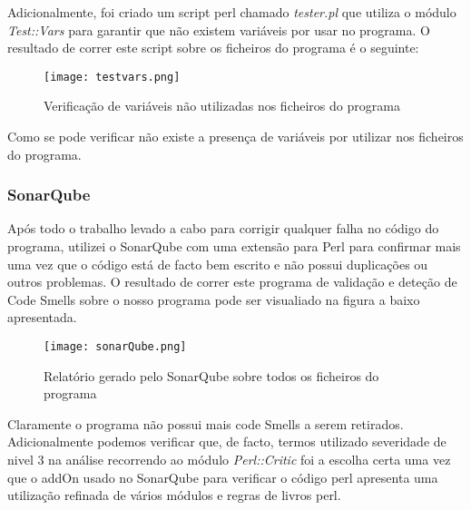 \par Adicionalmente, foi criado um script perl chamado \textit{tester.pl} que utiliza o módulo \textit{Test::Vars}\cite{testVars} para garantir que não existem variáveis por usar no programa. O resultado de correr este script sobre os ficheiros do programa é o seguinte:

\begin{figure}[H]

  \centering
  \captionsetup{justification=centering}

  \texttt{[image: testvars.png]}
  
  \caption {Verificação de variáveis não utilizadas nos ficheiros do programa}

\end{figure}
\par Como se pode verificar não existe a presença de variáveis por utilizar nos ficheiros do programa.


\subsubsection{SonarQube}
\hfill\newline

\par Após todo o trabalho levado a cabo para corrigir qualquer falha no código do programa, utilizei o SonarQube\cite{sonarQube} com uma extensão para Perl\cite{perlSonarQube} para confirmar mais uma vez que o código está de facto bem escrito e não possui duplicações ou outros problemas. O resultado de correr este programa de validação e deteção de Code Smells sobre o nosso programa pode ser visualiado na figura a baixo apresentada.

\begin{figure}[H]

  \centering
  \captionsetup{justification=centering}

  \texttt{[image: sonarQube.png]}
  
  \caption {Relatório gerado pelo SonarQube sobre todos os ficheiros do programa}

\end{figure}

\par Claramente o programa não possui mais code Smells a serem retirados. Adicionalmente podemos verificar que, de facto, termos utilizado severidade de nivel 3 na análise recorrendo ao módulo \textit{Perl::Critic} foi a escolha certa uma vez que o addOn usado no SonarQube para verificar o código perl apresenta uma utilização refinada de vários módulos\cite{develCover,perlCritic} e regras de livros perl\cite{codeSmells2,livro1,livro2,livro3,bestpractices}. 

